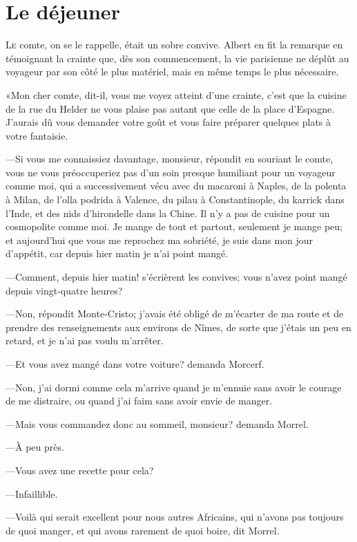 \chapter{Le déjeuner}

\lettrine{L}{e} comte, on se le rappelle, était un sobre convive. Albert en fit la remarque en témoignant la crainte que, dès son commencement, la vie parisienne ne déplût au voyageur par son côté le plus matériel, mais en même temps le plus nécessaire. 

«Mon cher comte, dit-il, vous me voyez atteint d'une crainte, c'est que la cuisine de la rue du Helder ne vous plaise pas autant que celle de la place d'Espagne. J'aurais dû vous demander votre goût et vous faire préparer quelques plats à votre fantaisie. 

—Si vous me connaissiez davantage, monsieur, répondit en souriant le comte, vous ne vous préoccuperiez pas d'un soin presque humiliant pour un voyageur comme moi, qui a successivement vécu avec du macaroni à Naples, de la polenta à Milan, de l'olla podrida à Valence, du pilau à Constantinople, du karrick dans l'Inde, et des nids d'hirondelle dans la Chine. Il n'y a pas de cuisine pour un cosmopolite comme moi. Je mange de tout et partout, seulement je mange peu; et aujourd'hui que vous me reprochez ma sobriété, je suis dans mon jour d'appétit, car depuis hier matin je n'ai point mangé. 

—Comment, depuis hier matin! s'écrièrent les convives; vous n'avez point mangé depuis vingt-quatre heures? 

—Non, répondit Monte-Cristo; j'avais été obligé de m'écarter de ma route et de prendre des renseignements aux environs de Nîmes, de sorte que j'étais un peu en retard, et je n'ai pas voulu m'arrêter. 

—Et vous avez mangé dans votre voiture? demanda Morcerf. 

—Non, j'ai dormi comme cela m'arrive quand je m'ennuie sans avoir le courage de me distraire, ou quand j'ai faim sans avoir envie de manger. 

—Mais vous commandez donc au sommeil, monsieur? demanda Morrel. 

—À peu près. 

—Vous avez une recette pour cela? 

—Infaillible. 

—Voilà qui serait excellent pour nous autres Africains, qui n'avons pas toujours de quoi manger, et qui avons rarement de quoi boire, dit Morrel. 

